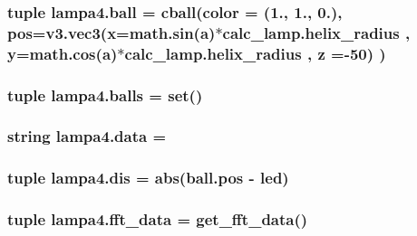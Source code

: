 \subsubsection[{ball}]{\setlength{\rightskip}{0pt plus 5cm}tuple lampa4.\+ball = {\bf cball}({\bf color} = (1., 1., 0.), {\bf pos}={\bf v3.\+vec3}(x=math.\+sin({\bf a})$\ast${\bf calc\+\_\+lamp.\+helix\+\_\+radius} , y=math.\+cos({\bf a})$\ast${\bf calc\+\_\+lamp.\+helix\+\_\+radius} , z =-\/50) )}\label{namespacelampa4_a1403f4237df39099e047bd2696eeb0d6}
\hypertarget{namespacelampa4_a961cb8be928e4a946445985d96c435c4}{}
\subsubsection[{balls}]{\setlength{\rightskip}{0pt plus 5cm}tuple lampa4.\+balls = set()}\label{namespacelampa4_a961cb8be928e4a946445985d96c435c4}
\hypertarget{namespacelampa4_abb87e1fb3487af72f4e3d54fbfefb295}{}
\subsubsection[{data}]{\setlength{\rightskip}{0pt plus 5cm}string lampa4.\+data = \textquotesingle{}\textquotesingle{}}\label{namespacelampa4_abb87e1fb3487af72f4e3d54fbfefb295}
\hypertarget{namespacelampa4_a345d6af3f00d4c0b0aa2b9f3fc73d853}{}
\subsubsection[{dis}]{\setlength{\rightskip}{0pt plus 5cm}tuple lampa4.\+dis = abs({\bf ball.\+pos} -\/ led)}\label{namespacelampa4_a345d6af3f00d4c0b0aa2b9f3fc73d853}
\hypertarget{namespacelampa4_a3b522b28f99168d8af9b8909e20143a7}{}
\subsubsection[{fft\+\_\+data}]{\setlength{\rightskip}{0pt plus 5cm}tuple lampa4.\+fft\+\_\+data = {\bf get\+\_\+fft\+\_\+data}()}\label{namespacelampa4_a3b522b28f99168d8af9b8909e20143a7}
\hypertarget{namespacelampa4_a81b2d75595cdc20eb54c714c56bfd08f}{}
